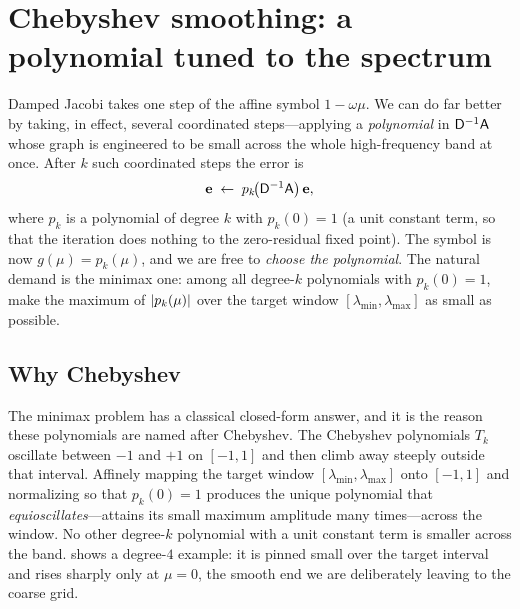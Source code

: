 \section{Chebyshev smoothing: a polynomial tuned to the spectrum}
\label{sec:smoo-cheby}

Damped Jacobi takes one step of the affine symbol $1-\omega\mu$. We can do far
better by taking, in effect, several coordinated steps---applying a
\emph{polynomial} in $\mathsf{D}^{-1}\mathsf{A}$ whose graph is engineered to be small
across the whole high-frequency band at once. After $k$ such coordinated steps the
error is
\begin{equation}
  \mathbf{e} \;\leftarrow\; p_k\!\bigl(\mathsf{D}^{-1}\mathsf{A}\bigr)\,\mathbf{e},
  \label{eq:smoo-cheby-action}
\end{equation}
where $p_k$ is a polynomial of degree $k$ with $p_k(0)=1$ (a unit constant term, so
that the iteration does nothing to the zero-residual fixed point). The symbol is now
$g(\mu)=p_k(\mu)$, and we are free to \emph{choose the polynomial}. The natural
demand is the minimax one: among all degree-$k$ polynomials with $p_k(0)=1$, make
the maximum of $\lvert p_k(\mu)\rvert$ over the target window $[\lambda_{\min},
\lambda_{\max}]$ as small as possible.

\subsection{Why Chebyshev}

The minimax problem has a classical closed-form answer, and it is the reason these
polynomials are named after Chebyshev. The Chebyshev polynomials $T_k$ oscillate
between $-1$ and $+1$ on $[-1,1]$ and then climb away steeply outside that interval.
Affinely mapping the target window $[\lambda_{\min},\lambda_{\max}]$ onto $[-1,1]$
and normalizing so that $p_k(0)=1$ produces the unique polynomial that
\emph{equioscillates}---attains its small maximum amplitude many times---across the
window. No other degree-$k$ polynomial with a unit constant term is smaller across
the band.  shows a degree-$4$ example: it is pinned small
over the target interval and rises sharply only at $\mu=0$, the smooth end we are
deliberately leaving to the coarse grid.

